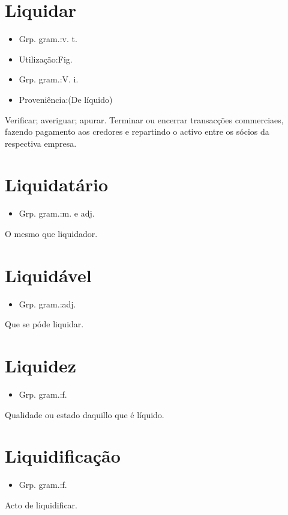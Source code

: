 \section{Liquidar}
\begin{itemize}
\item {Grp. gram.:v. t.}
\end{itemize}
\begin{itemize}
\item {Utilização:Fig.}
\end{itemize}
\begin{itemize}
\item {Grp. gram.:V. i.}
\end{itemize}
\begin{itemize}
\item {Proveniência:(De \textunderscore líquido\textunderscore )}
\end{itemize}
Verificar; averiguar; apurar.
Terminar ou encerrar transacções commerciaes, fazendo pagamento aos credores e repartindo o activo entre os sócios da respectiva empresa.
\section{Liquidatário}
\begin{itemize}
\item {Grp. gram.:m.  e  adj.}
\end{itemize}
O mesmo que \textunderscore liquidador\textunderscore .
\section{Liquidável}
\begin{itemize}
\item {Grp. gram.:adj.}
\end{itemize}
Que se póde liquidar.
\section{Liquidez}
\begin{itemize}
\item {Grp. gram.:f.}
\end{itemize}
Qualidade ou estado daquillo que é líquido.
\section{Liquidificação}
\begin{itemize}
\item {Grp. gram.:f.}
\end{itemize}
Acto de liquidificar.
